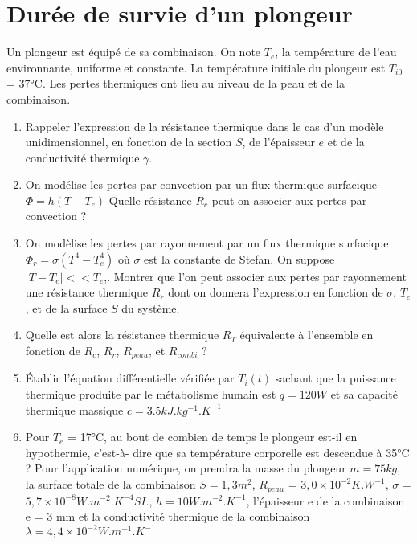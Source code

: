\documentclass{article}
\begin{document}
\section{Durée de survie d'un plongeur }
Un plongeur est équipé de sa combinaison.
On note $T_e$, la température de l’eau environnante, uniforme et constante. La température initiale du plongeur est $T_{i0}$ = 37°C. Les pertes thermiques ont lieu au niveau de la peau et de la
combinaison. 
\begin{enumerate}
    \item Rappeler l’expression de la résistance thermique dans le cas d’un modèle unidimensionnel,
en fonction de la section $S$, de l’épaisseur $e$ et de la conductivité thermique $\gamma$.
\item On modélise les pertes par convection par un flux thermique surfacique $\Phi = h(T-T_e)$
Quelle résistance $R_c$ peut-on associer aux pertes par convection ? 
\item  On modèlise les pertes par rayonnement par un flux thermique surfacique $\Phi_r = \sigma (T^4 - T_e^4)$
où $\sigma$ est la constante de Stefan. On suppose $|T-T_e|<<T_e$,. Montrer que l’on peut associer aux
pertes par rayonnement une résistance thermique $R_r$ dont on donnera l’expression en fonction
de $\sigma$, $T_e$, et de la surface $S$ du système. 
\item  Quelle est alors la résistance thermique $R_T$ équivalente à l’ensemble en fonction de $R_c$, $R_r$, $R_{peau}$, et $R_{combi}$ ?
\item  Établir l’équation différentielle vérifiée par $T_i(t)$ sachant que la puissance thermique produite par le métabolisme humain est $q = 120 W$ et sa capacité thermique massique $c = 3.5 kJ. kg^{-1}.K^{-1}$
\item Pour $T_e$ = 17°C, au bout de combien de temps le plongeur est-il en hypothermie, c’est-à- dire que sa température corporelle est descendue à 35°C ? Pour l’application numérique, on prendra la masse du plongeur $ m = 75 kg$, la surface totale de la combinaison $S = 1,3 m^2$, $R_{peau}$ = $3,0 \times 10^{-2} K.W^{-1}$, $\sigma$ =$5,7 \times 10^{-8} W.m^{-2} . K^{-4} SI.$,  $h = 10  W.m^{-2}.K^{-1}$, l’épaisseur e de la combinaison e = 3 mm et la conductivité thermique de la combinaison $\lambda = 4,4 \times 10^{-2} W.m^{-1}.K^{-1}$



\end{enumerate}
\end{document}
